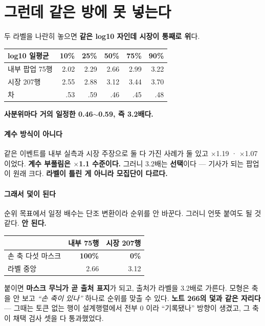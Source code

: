 \documentclass[10pt]{article}
\begin{document}
\section{그런데 같은 방에 못 넣는다}

두 라벨을 나란히 놓으면 \textbf{같은 log10 자인데 시장이 통째로 위}다.

\begin{center}\small
\begin{tabular}{lrrrrr}
\hline
log10 일평균 & 10\% & 25\% & 50\% & 75\% & 90\% \\
\hline
내부 팝업 75행 & 2.02 & 2.29 & 2.66 & 2.99 & 3.22 \\
시장 207행 & 2.55 & 2.88 & 3.12 & 3.44 & 3.70 \\
\hline
차 & .53 & .59 & .46 & .45 & .48 \\
\hline
\end{tabular}
\end{center}

\textbf{사분위마다 거의 일정한 0.46$\sim$0.59, 즉 3.2배다.}

\paragraph{계수 방식이 아니다} 같은 이벤트를 내부 실측과 시장 주장으로 둘 다
가진 사례가 둘 있고 $\times$1.19 · $\times$1.07 이었다. \textbf{계수 부풀림은
$\times$1.1 수준이다.} 그러니 3.2배는 \textbf{선택}이다 --- 기사가 되는
팝업이 원래 크다. \textbf{라벨이 틀린 게 아니라 모집단이 다르다.}

\paragraph{그래서 덫이 된다} 순위 목표에서 일정 배수는 단조 변환이라 순위를
안 바꾼다. 그러니 언뜻 붙여도 될 것 같다. \textbf{안 된다.}

\begin{center}\small
\begin{tabular}{lrr}
\hline
& 내부 75행 & 시장 207행 \\
\hline
손 축 다섯 마스크 & \textbf{100\%} & \textbf{0\%} \\
라벨 중앙 & 2.66 & 3.12 \\
\hline
\end{tabular}
\end{center}

붙이면 \textbf{마스크 무늬가 곧 출처 표지}가 되고, 출처가 라벨을 3.2배로
가른다. 모형은 축을 안 보고 \emph{``손 축이 있나''} 하나로 순위를 맞출 수
있다. \textbf{노트 266의 덫과 같은 자리다} --- 그때는 토큰 없는 행이
설계행렬에서 전부 0 이라 ``기록됐나'' 방향이 생겼고, 그 축이 채택 검사
셋을 다 통과했었다.
\end{document}
